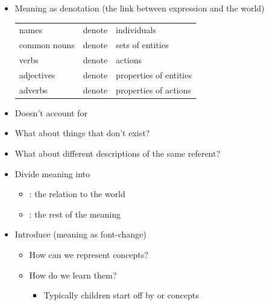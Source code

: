 \documentclass[headrule,footrule]{foils}
\begin{document}
\begin{itemize}
\item Meaning as denotation (the link between expression and the world)\\ 
  \begin{tabular}{lll}
    names & denote & individuals \\   
    common nouns & denote & sets of entities \\
    verbs  & denote & actions \\    
    adjectives  & denote & properties of entities \\
    adverbs  & denote & properties of actions \\
  \end{tabular}
\item Doesn't account for 
\item What about things that don't exist?
  \begin{exe}
    \ex {}
  \end{exe}
\item What about different descriptions of the same referent?
  \begin{exe}
    \ex {}
  \end{exe}
\end{itemize}


\begin{itemize}
\item Divide meaning into
  \begin{itemize}
  \item {}: the relation to the world
  \item {}: the rest of the meaning
  \end{itemize}
\item Introduce  \hfill (meaning as font-change)
  \begin{itemize}
  \item How can we represent concepts?
  \item How do we learn them?
    \begin{itemize}
    \item Typically children start off by  or  concepts
    \end{itemize}
  \end{itemize}
\end{itemize}
\end{document}
